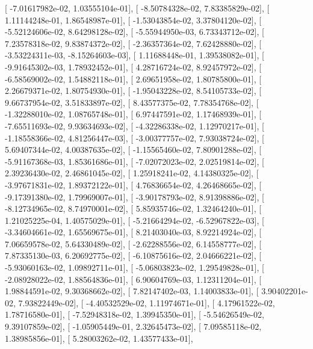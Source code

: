 \documentclass{article}
\begin{document}
       [ -7.01617982e-02,   1.03555104e-01],
       [ -8.50784328e-02,   7.83385829e-02],
       [  1.11144248e-01,   1.86548987e-01],
       [ -1.53043854e-02,   3.37804120e-02],
       [ -5.52124606e-02,   8.64298128e-02],
       [ -5.55944950e-03,   6.73343712e-02],
       [  7.23578318e-02,   9.83874372e-02],
       [ -2.36357364e-02,   7.62428880e-02],
       [ -3.53224311e-03,  -8.15264603e-03],
       [  1.11688448e-01,   1.39538082e-01],
       [ -9.91645302e-03,   1.78932452e-01],
       [  4.28716724e-02,   8.92457972e-02],
       [ -6.58569002e-02,   1.54882118e-01],
       [  2.69651958e-02,   1.80785800e-01],
       [  2.26679371e-02,   1.80754930e-01],
       [ -1.95043228e-02,   8.54105733e-02],
       [  9.66737954e-02,   3.51833897e-02],
       [  8.43577375e-02,   7.78354768e-02],
       [ -1.32288010e-02,   1.08765748e-01],
       [  6.97447591e-02,   1.17468939e-01],
       [ -7.65511693e-02,   9.93634693e-02],
       [ -4.32286338e-02,   1.12970217e-01],
       [ -1.18558366e-02,   4.81256447e-03],
       [ -3.00377757e-02,   7.93038724e-02],
       [  5.69407344e-02,   4.00387635e-02],
       [ -1.15565460e-02,   7.80901288e-02],
       [ -5.91167368e-03,   1.85361686e-01],
       [ -7.02072023e-02,   2.02519814e-02],
       [  2.39236430e-02,   2.46861045e-02],
       [  1.25918241e-02,   4.14380325e-02],
       [ -3.97671831e-02,   1.89372122e-01],
       [  4.76836654e-02,   4.26468665e-02],
       [ -9.17391380e-02,   1.79969007e-01],
       [ -3.90178793e-02,   8.91398886e-02],
       [ -8.12734965e-02,   8.74970001e-02],
       [  5.85935746e-02,   1.32464240e-01],
       [  1.21025225e-04,   1.40575029e-01],
       [ -5.21664294e-02,  -6.52967822e-03],
       [ -3.34604661e-02,   1.65569675e-01],
       [  8.21403040e-03,   8.92214924e-02],
       [  7.06659578e-02,   5.64330489e-02],
       [ -2.62288556e-02,   6.14558777e-02],
       [  7.87335130e-03,   6.20692775e-02],
       [ -6.10875616e-02,   2.04666221e-02],
       [ -5.93060163e-02,   1.09892711e-01],
       [ -5.06803823e-02,   1.29549828e-01],
       [ -2.08928022e-02,   1.88564836e-01],
       [  6.90604769e-03,   1.12311204e-01],
       [  1.98844591e-02,   9.30368662e-02],
       [  7.82147402e-03,   1.14003833e-01],
       [  3.90402201e-02,   7.93822449e-02],
       [ -4.40532529e-02,   1.11974671e-01],
       [  4.17961522e-02,   1.78716580e-01],
       [ -7.52948318e-02,   1.39945350e-01],
       [ -5.54626549e-02,   9.39107859e-02],
       [ -1.05905449e-01,   2.32645473e-02],
       [  7.09585118e-02,   1.38985856e-01],
       [  5.28003262e-02,   1.43577433e-01],
\end{document}
